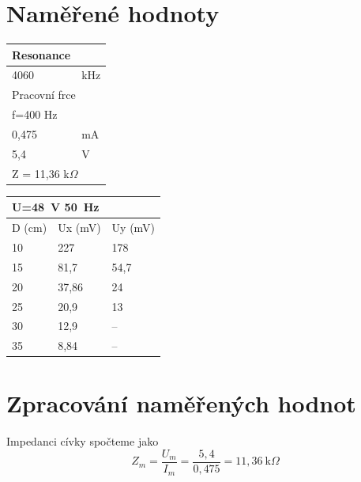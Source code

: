 \documentclass[a4paper,12pt]{article}   %
\begin{document}
\section{Naměřené hodnoty}
\label{chap:namerene_hodnoty}
\begin{table}[h!]
  \centering
  \begin{tabular}{|l|l|}
  \hline
  Resonance              &                  \\ \hline
  4060                   & kHz              \\ \hline
  \multicolumn{2}{|l|}{Pracovní frce}       \\ \hline
  f=400 Hz               &                  \\ \hline
  0,475                  & mA               \\ \hline
  5,4                    & V                \\ \hline
  \multicolumn{2}{|l|}{Z = 11,36 k$\Omega$} \\ \hline
  \end{tabular}
\end{table}

\begin{table}[h!]
  \centering
  \begin{tabular}{|l|l|l|}
  \hline
  \multicolumn{2}{|l|}{U=48~V 50~Hz} &         \\ \hline
  D (cm)               & Ux (mV)               & Uy (mV) \\ \hline
  10                   & 227                   & 178     \\ \hline
  15                   & 81,7                  & 54,7    \\ \hline
  20                   & 37,86                 & 24      \\ \hline
  25                   & 20,9                  & 13      \\ \hline
  30                   & 12,9                  &      --   \\ \hline
  35                   & 8,84                  &    --     \\ \hline
  \end{tabular}
\end{table}


\section{Zpracování naměřených hodnot}
\label{chap:zpracovani_hodnot}
Impedanci cívky spočteme jako
\begin{equation}
  Z_m = \frac{U_m}{I_m} = \frac{5,4}{0,475} = 11,36~\text{k}\Omega
\end{equation}
\end{document}

